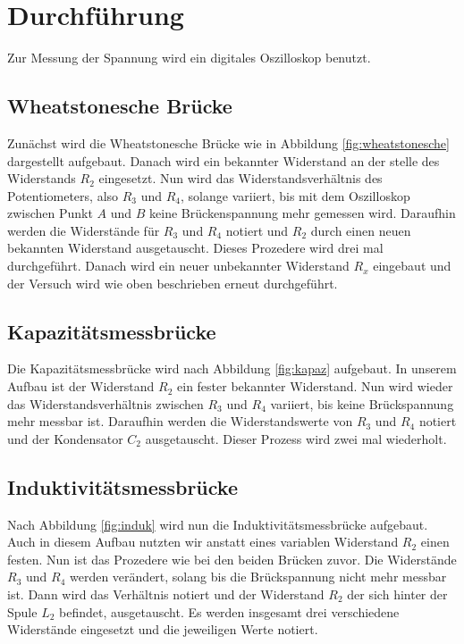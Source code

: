 \section{Durchführung}
\label{sec:Durchführung}

Zur Messung der Spannung wird ein digitales Oszilloskop benutzt.

\subsection{Wheatstonesche Brücke}

Zunächst wird die Wheatstonesche Brücke wie in Abbildung \ref{fig:wheatstonesche} dargestellt aufgebaut.
Danach wird ein bekannter Widerstand an der stelle des Widerstands $R_2$ eingesetzt.
Nun wird das Widerstandsverhältnis des Potentiometers, also $R_3$ und $R_4$, solange variiert, bis mit dem Oszilloskop zwischen Punkt $A$ und $B$ keine Brückenspannung mehr gemessen wird.
Daraufhin werden die Widerstände für $R_3$ und $R_4$ notiert und $R_2$ durch einen neuen bekannten Widerstand ausgetauscht.
Dieses Prozedere wird drei mal durchgeführt.
Danach wird ein neuer unbekannter Widerstand $R_x$ eingebaut und der Versuch wird wie oben beschrieben erneut durchgeführt.

\subsection{Kapazitätsmessbrücke}

Die Kapazitätsmessbrücke wird nach Abbildung \ref{fig:kapaz} aufgebaut.
In unserem Aufbau ist der Widerstand $R_2$ ein fester bekannter Widerstand.
Nun wird wieder das Widerstandsverhältnis zwischen $R_3$ und $R_4$ variiert, bis keine Brückspannung mehr messbar ist.
Daraufhin werden die Widerstandswerte von $R_3$ und $R_4$ notiert und der Kondensator $C_2$ ausgetauscht.
Dieser Prozess wird zwei mal wiederholt.

\subsection{Induktivitätsmessbrücke}

Nach Abbildung \ref{fig:induk} wird nun die Induktivitätsmessbrücke aufgebaut.
Auch in diesem Aufbau nutzten wir anstatt eines variablen Widerstand $R_2$ einen festen.
Nun ist das Prozedere wie bei den beiden Brücken zuvor. Die Widerstände $R_3$ und $R_4$ werden verändert, solang bis die Brückspannung nicht mehr messbar ist.
Dann wird das Verhältnis notiert und der Widerstand $R_2$ der sich hinter der Spule $L_2$ befindet, ausgetauscht.
Es werden insgesamt drei verschiedene Widerstände eingesetzt und die jeweiligen Werte notiert.

